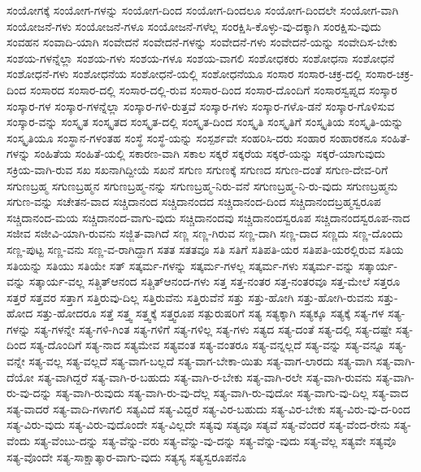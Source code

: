 {ಸಂಯೋಗಕ್ಕೆ
ಸಂಯೋಗ-ಗಳನ್ನು
ಸಂಯೋಗ-ದಿಂದ
ಸಂಯೋಗ-ದಿಂದಲೂ
ಸಂಯೋಗ-ದಿಂದಲೇ
ಸಂಯೋಗ-ವಾಗಿ
ಸಂಯೋಜನೆ-ಗಳು
ಸಂಯೋಜನೆ-ಗಳೂ
ಸಂಯೋಜನೆ-ಗಳೆಲ್ಲ
ಸಂರಕ್ಷಿಸಿ-ಕೊಳ್ಳು-ವು-ದಕ್ಕಾಗಿ
ಸಂರಕ್ಷಿಸು-ವುದು
ಸಂವಹನ
ಸಂವಾದಿ-ಯಾಗಿ
ಸಂವೇದನೆ
ಸಂವೇದನೆ-ಗಳನ್ನು
ಸಂವೇದನೆ-ಗಳು
ಸಂವೇದನೆ-ಯನ್ನು
ಸಂವೇದಿಸ-ಬೇಕು
ಸಂಶಯ-ಗಳನ್ನೆಲ್ಲಾ
ಸಂಶಯ-ಗಳು
ಸಂಶಯ-ಗಳೂ
ಸಂಶಯ-ವಾಗಲಿ
ಸಂಶೋಧಕರು
ಸಂಶೋಧನಾ
ಸಂಶೋಧನೆ
ಸಂಶೋಧನೆ-ಗಳು
ಸಂಶೋಧನೆಯ
ಸಂಶೋಧನೆ-ಯಲ್ಲಿ
ಸಂಶೋಧನೆಯೂ
ಸಂಸಾರ
ಸಂಸಾರ-ಚಕ್ರ-ದಲ್ಲಿ
ಸಂಸಾರ-ಚಕ್ರ-ದಿಂದ
ಸಂಸಾರದ
ಸಂಸಾರ-ದಲ್ಲಿ
ಸಂಸಾರ-ದಲ್ಲಿ-ರುವ
ಸಂಸಾರ-ದಿಂದ
ಸಂಸಾರ-ದೊಂದಿಗೆ
ಸಂಸಾರಸ್ವಪ್ನದ
ಸಂಸ್ಕಾರ
ಸಂಸ್ಕಾರ-ಗಳ
ಸಂಸ್ಕಾರ-ಗಳನ್ನೆಲ್ಲಾ
ಸಂಸ್ಕಾರ-ಗಳಿ-ರುತ್ತವೆ
ಸಂಸ್ಕಾರ-ಗಳು
ಸಂಸ್ಕಾರ-ಗಳೊ-ಡನೆ
ಸಂಸ್ಕಾರ-ಗೊಳಿಸುವ
ಸಂಸ್ಕಾರ-ವನ್ನು
ಸಂಸ್ಕೃತ
ಸಂಸ್ಕೃತದ
ಸಂಸ್ಕೃತ-ದಲ್ಲಿ
ಸಂಸ್ಕೃತ-ದಿಂದ
ಸಂಸ್ಕೃತಿ
ಸಂಸ್ಕೃತಿಗೆ
ಸಂಸ್ಕೃತಿಯ
ಸಂಸ್ಕೃತಿ-ಯನ್ನು
ಸಂಸ್ಕೃತಿಯೂ
ಸಂಸ್ಥಾನ-ಗಳಂತಹ
ಸಂಸ್ಥೆ
ಸಂಸ್ಥೆ-ಯನ್ನು
ಸಂಸ್ಪರ್ಶವೇ
ಸಂಹರಿಸಿ-ದರು
ಸಂಹಾರ
ಸಂಹಾರಕನೂ
ಸಂಹಿತೆ-ಗಳನ್ನು
ಸಂಹಿತೆಯ
ಸಂಹಿತೆ-ಯಲ್ಲಿ
ಸಕಾರಣ-ವಾಗಿ
ಸಕಾಲ
ಸಕ್ಕರೆ
ಸಕ್ಕರೆಯ
ಸಕ್ಕರೆ-ಯನ್ನು
ಸಕ್ಕರೆ-ಯಾಗುವುದು
ಸಕ್ರಿಯ-ವಾಗಿ-ರುವ
ಸಖ
ಸಖನಾಗಿದ್ದೀಯೆ
ಸಖನೆ
ಸಗುಣ
ಸಗುಣಕ್ಕೆ
ಸಗುಣದ
ಸಗುಣ-ದಂತೆ
ಸಗುಣ-ದೇವ-ರಿಗೆ
ಸಗುಣಬ್ರಹ್ಮ
ಸಗುಣಬ್ರಹ್ಮನ
ಸಗುಣಬ್ರಹ್ಮ-ನನ್ನು
ಸಗುಣಬ್ರಹ್ಮ-ನಿರು-ವನೆ
ಸಗುಣಬ್ರಹ್ಮ-ನಿ-ರು-ವುದು
ಸಗುಣಬ್ರಹ್ಮನು
ಸಗುಣ-ವನ್ನು
ಸಚೇತನ-ವಾದ
ಸಚ್ಚಿದಾನಂದ
ಸಚ್ಚಿದಾನಂದದ
ಸಚ್ಚಿದಾನಂದ-ದಿಂದ
ಸಚ್ಚಿದಾನಂದಬ್ರಹ್ಮಸ್ವರೂಪ
ಸಚ್ಚಿದಾನಂದ-ಮಯ
ಸಚ್ಚಿದಾನಂದ-ವಾಗು-ವುದು
ಸಚ್ಚಿದಾನಂದವು
ಸಚ್ಚಿದಾನಂದಸ್ವರೂಪ
ಸಚ್ಚಿದಾನಂದಸ್ವರೂಪ-ನಾದ
ಸಜೀವ
ಸಜೀವಿ-ಯಾಗಿ-ರುವನು
ಸಜ್ಜಿತ-ವಾಗಿದೆ
ಸಣ್ಣ
ಸಣ್ಣ-ಗಿರುವ
ಸಣ್ಣ-ದಾಗಿ
ಸಣ್ಣ-ದಾದ
ಸಣ್ಣದು
ಸಣ್ಣ-ದೊಂದು
ಸಣ್ಣ-ಪುಟ್ಟ
ಸಣ್ಣ-ವನು
ಸಣ್ಣ-ವ-ರಾಗಿದ್ದಾಗ
ಸತತ
ಸತತವೂ
ಸತಿ
ಸತಿಗೆ
ಸತಿಪತಿ-ಯರ
ಸತಿಪತಿ-ಯರಲ್ಲಿರುವ
ಸತಿಯ
ಸತಿಯನ್ನು
ಸತಿಯು
ಸತಿಯೇ
ಸತ್
ಸತ್ಕರ್ಮ-ಗಳನ್ನು
ಸತ್ಕರ್ಮ-ಗಳಲ್ಲ
ಸತ್ಕರ್ಮ-ಗಳು
ಸತ್ಕರ್ಮ-ವನ್ನು
ಸತ್ಕಾರ್ಯ-ವನ್ನು
ಸತ್ಕಾರ್ಯ-ವಲ್ಲ
ಸತ್ಚಿತ್ಆನಂದ
ಸತ್ಚಿತ್ಆನಂದ-ಗಳು
ಸತ್ತ
ಸತ್ತ-ನಂತರ
ಸತ್ತ-ನಂತರವೂ
ಸತ್ತ-ಮೇಲೆ
ಸತ್ತರೂ
ಸತ್ತರೆ
ಸತ್ತವರ
ಸತ್ತಾಗ
ಸತ್ತಿರುವು-ದಿಲ್ಲ
ಸತ್ತಿರುವೆನು
ಸತ್ತಿರುವೆನೆ
ಸತ್ತು
ಸತ್ತು-ಹೋಗಿ
ಸತ್ತು-ಹೋಗಿ-ರುವನು
ಸತ್ತು-ಹೋದ
ಸತ್ತು-ಹೋದರೂ
ಸತ್ತೆ
ಸತ್ತ್ವ
ಸತ್ತ್ವಕ್ಕೆ
ಸತ್ತ್ವರೂಪ
ಸತ್ಪುರುಷರಿಗೆ
ಸತ್ಯ
ಸತ್ಯಕ್ಕಾಗಿ
ಸತ್ಯಕ್ಕೂ
ಸತ್ಯಕ್ಕೆ
ಸತ್ಯ-ಗಳ
ಸತ್ಯ-ಗಳನ್ನು
ಸತ್ಯ-ಗಳನ್ನೇ
ಸತ್ಯ-ಗಳಿ-ಗಿಂತ
ಸತ್ಯ-ಗಳಿಗೆ
ಸತ್ಯ-ಗಳಿಲ್ಲ
ಸತ್ಯ-ಗಳು
ಸತ್ಯದ
ಸತ್ಯ-ದಂತೆ
ಸತ್ಯ-ದಲ್ಲಿ
ಸತ್ಯ-ದಷ್ಟೇ
ಸತ್ಯ-ದಿಂದ
ಸತ್ಯ-ದೊಂದಿಗೆ
ಸತ್ಯ-ನಾದ
ಸತ್ಯಮೇವ
ಸತ್ಯವಂತ
ಸತ್ಯ-ವಂತರೂ
ಸತ್ಯ-ವನ್ನಲ್ಲದೆ
ಸತ್ಯ-ವನ್ನು
ಸತ್ಯ-ವನ್ನೂ
ಸತ್ಯ-ವನ್ನೇ
ಸತ್ಯ-ವಲ್ಲ
ಸತ್ಯ-ವಲ್ಲದೆ
ಸತ್ಯ-ವಾಗ-ಬಲ್ಲದೆ
ಸತ್ಯ-ವಾಗ-ಬೇಕಾ-ಯಿತು
ಸತ್ಯ-ವಾಗ-ಲಾರದು
ಸತ್ಯ-ವಾಗಿ
ಸತ್ಯ-ವಾಗಿ-ದೆಯೋ
ಸತ್ಯ-ವಾಗಿದ್ದರೆ
ಸತ್ಯ-ವಾಗಿ-ರ-ಬಹುದು
ಸತ್ಯ-ವಾಗಿ-ರ-ಬೇಕು
ಸತ್ಯ-ವಾಗಿ-ರಲೇ
ಸತ್ಯ-ವಾಗಿ-ರುವನು
ಸತ್ಯ-ವಾಗಿ-ರು-ವು-ದನ್ನು
ಸತ್ಯ-ವಾಗಿ-ರುವುದು
ಸತ್ಯ-ವಾಗಿ-ರು-ವು-ದೆಲ್ಲ
ಸತ್ಯ-ವಾಗಿ-ರು-ವುದೋ
ಸತ್ಯ-ವಾಗು-ವು-ದಿಲ್ಲ
ಸತ್ಯ-ವಾದ
ಸತ್ಯ-ವಾದರೆ
ಸತ್ಯ-ವಾದಿ-ಗಳಾಗಲಿ
ಸತ್ಯವಿದೆ
ಸತ್ಯ-ವಿದ್ದರೆ
ಸತ್ಯ-ವಿರ-ಬಹುದು
ಸತ್ಯ-ವಿರ-ಬೇಕು
ಸತ್ಯ-ವಿರು-ವು-ದ-ರಿಂದ
ಸತ್ಯ-ವಿರು-ವುದು
ಸತ್ಯ-ವಿರು-ವುದೊಂದೇ
ಸತ್ಯ-ವಿಲ್ಲದೇ
ಸತ್ಯವು
ಸತ್ಯವೂ
ಸತ್ಯವೆ
ಸತ್ಯ-ವೆಂದರೆ
ಸತ್ಯ-ವೆಂದ-ರೇನು
ಸತ್ಯ-ವೆಂದು
ಸತ್ಯ-ವೆಂಬು-ದನ್ನು
ಸತ್ಯ-ವೆನ್ನು-ವರು
ಸತ್ಯ-ವೆನ್ನು-ವು-ದನ್ನು
ಸತ್ಯ-ವೆನ್ನು-ವುದು
ಸತ್ಯ-ವೆಲ್ಲ
ಸತ್ಯವೇ
ಸತ್ಯವೊ
ಸತ್ಯ-ವೊಂದೇ
ಸತ್ಯ-ಸಾಕ್ಷಾತ್ಕಾರ-ವಾಗು-ವುದು
ಸತ್ಯಸ್ಯ
ಸತ್ಯಸ್ವರೂಪನೊ
}
